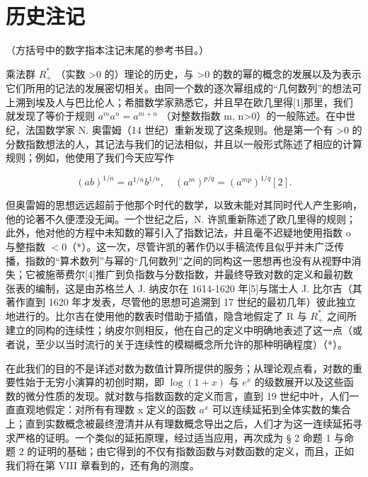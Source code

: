 \section*{历史注记}
{}

（方括号中的数字指本注记末尾的参考书目。）

乘法群 \(R_{+}^{*}\) （实数 \textgreater0 的）理论的历史，与 \textgreater0 的数的幂的概念的发展以及为表示它们所用的记法的发展密切相关。由同一个数的逐次幂组成的“几何数列”的想法可上溯到埃及人与巴比伦人；希腊数学家熟悉它，并且早在欧几里得{[}1{]}那里，我们就发现了等价于规则 \(a^{m}a^{n}=a^{m+n}\) （对整数指数 m, n\textgreater0）的一般陈述。在中世纪，法国数学家 N. 奥雷姆（14 世纪）重新发现了这条规则。他是第一个有 \textgreater0 的分数指数想法的人，其记法与我们的记法相似，并且以一般形式陈述了相应的计算规则；例如，他使用了我们今天应写作

\[
(a b) ^ {1 / n} = a ^ {1 / n} b ^ {1 / n}, \quad (a ^ {m}) ^ {p / q} = (a ^ {m p}) ^ {1 / q} [ 2 ].
\]

但奥雷姆的思想远远超前于他那个时代的数学，以致未能对其同时代人产生影响，他的论著不久便湮没无闻。一个世纪之后，N. 许凯重新陈述了欧几里得的规则；此外，他对他的方程中未知数的幂引入了指数记法，并且毫不迟疑地使用指数 o 与整指数 \(< 0\)（*）。这一次，尽管许凯的著作仍以手稿流传且似乎并未广泛传播，指数的“算术数列”与幂的“几何数列”之间的同构这一思想再也没有从视野中消失；它被施蒂费尔{[}4{]}推广到负指数与分数指数，并最终导致对数的定义和最初数张表的编制，这是由苏格兰人 J. 纳皮尔在 1614-1620 年{[}5{]}与瑞士人 J. 比尔吉（其著作直到 1620 年才发表，尽管他的思想可追溯到 17 世纪的最初几年）彼此独立地进行的。比尔吉在使用他的数表时借助于插值，隐含地假定了 R 与 \(R^{*}_{+}\) 之间所建立的同构的连续性；纳皮尔则相反，他在自己的定义中明确地表述了这一点（或者说，至少以当时流行的关于连续性的模糊概念所允许的那种明确程度）（*）。

在此我们的目的不是详述对数为数值计算所提供的服务；从理论观点看，对数的重要性始于无穷小演算的初创时期，即 \(\log(1+x)\) 与 \(e^{x}\) 的级数展开以及这些函数的微分性质的发现。就对数与指数函数的定义而言，直到 19 世纪中叶，人们一直直观地假定：对所有有理数 x 定义的函数 \(a^{x}\) 可以连续延拓到全体实数的集合上；直到实数概念被最终澄清并从有理数概念导出之后，人们才为这一连续延拓寻求严格的证明。一个类似的延拓原理，经过适当应用，再次成为 § 2 命题 1 与命题 2 的证明的基础；由它得到的不仅有指数函数与对数函数的定义，而且，正如我们将在第 VIII 章看到的，还有角的测度。

